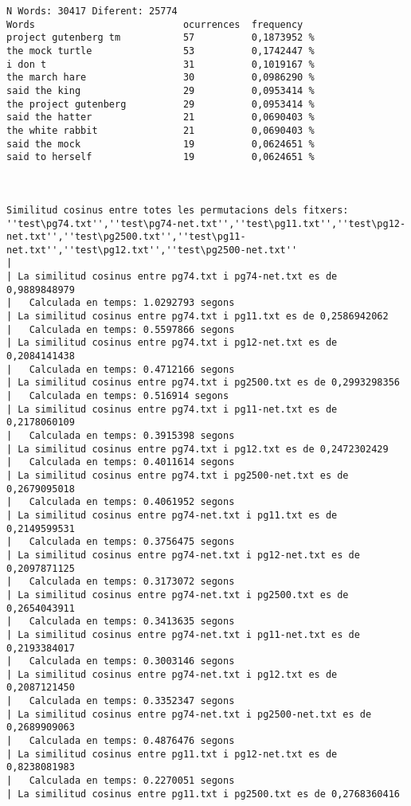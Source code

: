 \documentclass{report}
\begin{document}
\begin{verbatim}
N Words: 30417 Diferent: 25774
Words                          ocurrences  frequency
project gutenberg tm           57          0,1873952 %
the mock turtle                53          0,1742447 %
i don t                        31          0,1019167 %
the march hare                 30          0,0986290 %
said the king                  29          0,0953414 %
the project gutenberg          29          0,0953414 %
said the hatter                21          0,0690403 %
the white rabbit               21          0,0690403 %
said the mock                  19          0,0624651 %
said to herself                19          0,0624651 %



Similitud cosinus entre totes les permutacions dels fitxers:
''test\pg74.txt'',''test\pg74-net.txt'',''test\pg11.txt'',''test\pg12-net.txt'',''test\pg2500.txt'',''test\pg11-net.txt'',''test\pg12.txt'',''test\pg2500-net.txt''
|
| La similitud cosinus entre pg74.txt i pg74-net.txt es de 0,9889848979
|	Calculada en temps: 1.0292793 segons
| La similitud cosinus entre pg74.txt i pg11.txt es de 0,2586942062
|	Calculada en temps: 0.5597866 segons
| La similitud cosinus entre pg74.txt i pg12-net.txt es de 0,2084141438
|	Calculada en temps: 0.4712166 segons
| La similitud cosinus entre pg74.txt i pg2500.txt es de 0,2993298356
|	Calculada en temps: 0.516914 segons
| La similitud cosinus entre pg74.txt i pg11-net.txt es de 0,2178060109
|	Calculada en temps: 0.3915398 segons
| La similitud cosinus entre pg74.txt i pg12.txt es de 0,2472302429
|	Calculada en temps: 0.4011614 segons
| La similitud cosinus entre pg74.txt i pg2500-net.txt es de 0,2679095018
|	Calculada en temps: 0.4061952 segons
| La similitud cosinus entre pg74-net.txt i pg11.txt es de 0,2149599531
|	Calculada en temps: 0.3756475 segons
| La similitud cosinus entre pg74-net.txt i pg12-net.txt es de 0,2097871125
|	Calculada en temps: 0.3173072 segons
| La similitud cosinus entre pg74-net.txt i pg2500.txt es de 0,2654043911
|	Calculada en temps: 0.3413635 segons
| La similitud cosinus entre pg74-net.txt i pg11-net.txt es de 0,2193384017
|	Calculada en temps: 0.3003146 segons
| La similitud cosinus entre pg74-net.txt i pg12.txt es de 0,2087121450
|	Calculada en temps: 0.3352347 segons
| La similitud cosinus entre pg74-net.txt i pg2500-net.txt es de 0,2689909063
|	Calculada en temps: 0.4876476 segons
| La similitud cosinus entre pg11.txt i pg12-net.txt es de 0,8238081983
|	Calculada en temps: 0.2270051 segons
| La similitud cosinus entre pg11.txt i pg2500.txt es de 0,2768360416

\end{verbatim}
\end{document}
